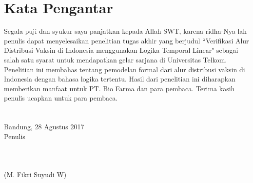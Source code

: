 \chapter*{Kata Pengantar}

Segala puji dan syukur saya panjatkan kepada Allah SWT, karena ridha-Nya lah penulis dapat menyelesaikan penelitian tugas akhir yang berjudul ``Verifikasi Alur Distribusi Vaksin di Indonesia menggunakan Logika Temporal Linear" sebagai salah satu syarat untuk mendapatkan gelar sarjana di Universitas Telkom. Penelitian ini membahas tentang pemodelan formal dari alur distribusi vaksin di Indonesia dengan bahasa logika tertentu. Hasil dari penelitian ini diharapkan memberikan manfaat untuk PT. Bio Farma dan para pembaca. Terima kasih penulis ucapkan untuk para pembaca.\\\\\\Bandung, 28 Agustus 2017
\\
Penulis
\\
\\
\\
\\
(M. Fikri Suyudi W)